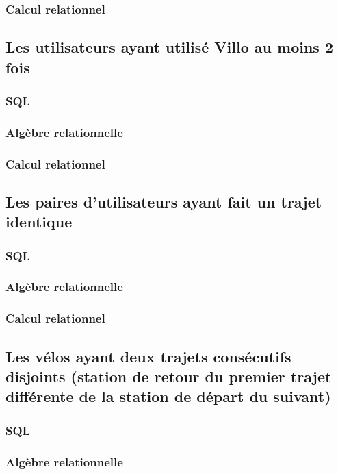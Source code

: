 \documentclass[a4paper,10pt]{article}
\begin{document}
\subsubsection{Calcul relationnel}

\subsection{Les utilisateurs ayant utilisé Villo au moins 2 fois}
\subsubsection{SQL}

\subsubsection{Algèbre relationnelle}
\subsubsection{Calcul relationnel}

\subsection{Les paires d'utilisateurs ayant fait un trajet identique}
\subsubsection{SQL}

\subsubsection{Algèbre relationnelle}
\subsubsection{Calcul relationnel}

\subsection{Les vélos ayant deux trajets consécutifs disjoints (station de retour du premier trajet différente de la station de départ du suivant)}
\subsubsection{SQL}

\subsubsection{Algèbre relationnelle}
\end{document}
